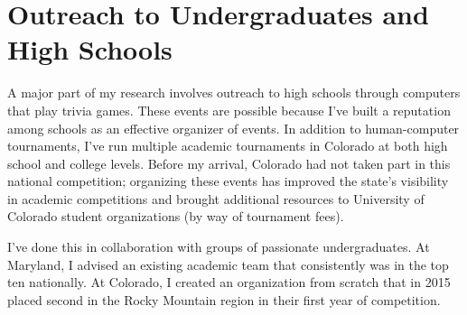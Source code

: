 \documentclass[11pt]{amsart}
\begin{document}
\section{Outreach to Undergraduates and High Schools}

A major part of my research involves outreach to high schools through computers
that play trivia games.  These events are possible because I've built a
reputation among schools as an effective organizer of events.  In addition to
human-computer tournaments, I've run multiple academic tournaments in Colorado
at both high school and college levels.  Before my arrival, Colorado had not
taken part in this national competition; organizing these events has improved
the state's visibility in academic competitions and brought additional resources
to University of Colorado student organizations (by way of tournament fees).

I've done this in collaboration with groups of passionate
undergraduates.  At Maryland, I advised an existing academic team that
consistently was in the top ten nationally.  At Colorado, I created an
organization from scratch that in 2015 placed second in the Rocky
Mountain region in their first year of competition.


%
%
\end{document}
